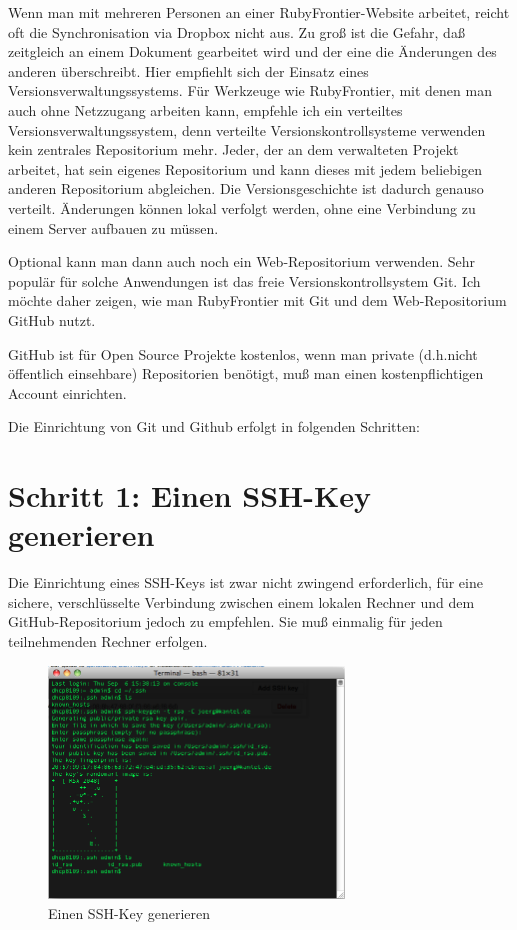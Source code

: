 \documentclass[11pt]{report}
\begin{document}
Wenn man mit mehreren Personen an einer RubyFrontier-Website arbeitet,
reicht oft die Synchronisation via Dropbox nicht aus. Zu groß ist die
Gefahr, daß zeitgleich an einem Dokument gearbeitet wird und der eine
die Änderungen des anderen überschreibt. Hier empfiehlt sich der
Einsatz eines Versionsverwaltungssystems. Für Werkzeuge wie
RubyFrontier, mit denen man auch ohne Netzzugang arbeiten kann,
empfehle ich ein verteiltes Versionsverwaltungssystem, denn verteilte
Versionskontrollsysteme verwenden kein zentrales Repositorium
mehr. Jeder, der an dem verwalteten Projekt arbeitet, hat sein eigenes
Repositorium und kann dieses mit jedem beliebigen anderen Repositorium
abgleichen. Die Versionsgeschichte ist dadurch genauso
verteilt. Änderungen können lokal verfolgt werden, ohne eine
Verbindung zu einem Server aufbauen zu müssen.


Optional kann man dann auch noch ein Web-Repositorium verwenden. Sehr
populär für solche Anwendungen ist das freie Versionskontrollsystem
Git. Ich möchte daher zeigen, wie man RubyFrontier mit Git und dem
Web-Repositorium GitHub nutzt.


GitHub ist für Open Source Projekte kostenlos, wenn man private
(d.h.nicht öffentlich einsehbare) Repositorien benötigt, muß man einen
kostenpflichtigen Account einrichten.


Die Einrichtung von Git und Github erfolgt in folgenden Schritten:
\section{Schritt 1: Einen SSH-Key generieren}
\label{sec-2-11-1}


Die Einrichtung eines SSH-Keys ist zwar nicht zwingend erforderlich,
für eine sichere, verschlüsselte Verbindung zwischen einem lokalen
Rechner und dem GitHub-Repositorium jedoch zu empfehlen. Sie muß
einmalig für jeden teilnehmenden Rechner erfolgen.

\begin{figure}[h!]
\centering
\includegraphics[width=0.7\textwidth]{./images/generate-ssh.png}
\caption{\label{generate-ssh}Einen SSH-Key generieren}
\end{figure}
\end{document}
